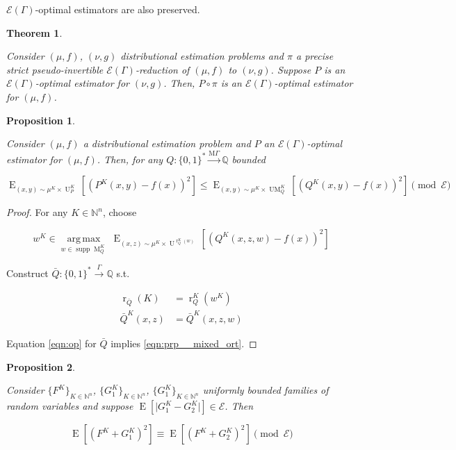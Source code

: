 \documentclass{article}
\numberwithin{equation}{section}
\theoremstyle{definition}
\theoremstyle{plain}
\newtheorem{theorem}{Theorem}[section]
\newtheorem{proposition}{Proposition}[section]
\newcommand{\Bool}{\{0,1\}}
\newcommand{\Words}{{\Bool^*}}
\DeclareMathOperator{\Supp}{supp}
\DeclareMathOperator{\E}{E}
\DeclareMathOperator{\R}{r}
\DeclareMathOperator{\M}{M}
\DeclareMathOperator{\UM}{UM}
\DeclareMathOperator{\Un}{U}
\newcommand{\Argmax}[1]{\underset{#1}{\operatorname{arg\,max}}\,}
\newcommand{\Nats}{\mathbb{N}}
\newcommand{\Rats}{\mathbb{Q}}
\newcommand{\Abs}[1]{\lvert #1 \rvert}
\newcommand{\MGrow}{\mathrm{M}\Gamma}
\newcommand{\Fall}{\mathcal{E}}
\newcommand{\EG}{\Fall(\Gamma)}
\newcommand{\Scheme}{\xrightarrow{\Gamma}}
\newcommand{\MScheme}{\xrightarrow{\MGrow}}
\begin{document}
$\EG$-optimal estimators are also preserved.

\begin{samepage}
\begin{theorem}
\label{thm:psp_reduce}

Consider $(\mu,f)$, $(\nu,g)$ distributional estimation problems and $\pi$ a precise strict pseudo-invertible $\EG$-reduction of $(\mu, f)$ to $(\nu, g)$. Suppose $P$ is an $\EG$-optimal estimator for $(\nu, g)$. Then, $P \circ \pi$ is an $\EG$-optimal estimator for $(\mu, f)$.

\end{theorem}
\end{samepage}

\begin{samepage}
\begin{proposition}
\label{prp:mixed_opt}

Consider ${(\mu,f)}$ a distributional estimation problem and ${P}$ an ${\EG}$-optimal estimator for ${(\mu,f)}$. Then, for any $Q: \Words \MScheme \Rats$ bounded

\begin{equation}
\label{eqn:prp__mixed_ort}
\E_{(x,y) \sim \mu^{K} \times \Un_P^K}[(P^K(x,y) - f(x))^2] \leq \E_{(x,y) \sim \mu^{K} \times \UM_Q^K}[(Q^K(x,y)-f(x))^2] \pmod \Fall
\end{equation}

\end{proposition}
\end{samepage}

\begin{proof}

For any ${K \in \Nats^n}$, choose 

\[w^K \in \Argmax{w \in \Supp \M_Q^K} \E_{(x,z) \sim \mu^{K} \times \Un^{\R_Q^K(w)}}[(Q^K(x,z,w)-f(x))^2]\]

Construct ${\bar{Q}: \Words \Scheme \Rats}$ s.t.

\begin{align*}
\R_{\bar{Q}}(K) &= \R_Q^K(w^K) \\
\bar{Q}^K(x,z) &= \bar{Q}^K(x,z,w)
\end{align*}

Equation \ref{eqn:op} for ${\bar{Q}}$ implies \ref{eqn:prp__mixed_ort}.
%
\end{proof}

\begin{samepage}
\begin{proposition}
\label{prp:sq_diff_cong}

Consider $\{F^K\}_{K \in \Nats^n}$, $\{G_1^K\}_{K \in \Nats^n}$, $\{G_1^K\}_{K \in \Nats^n}$ uniformly bounded families of random variables and suppose ${\E[\Abs{G_1^K - G_2^K}] \in \Fall}$. Then

\begin{equation}
\E[(F^K + G_1^K)^2] \equiv \E[(F^K + G_2^K)^2] \pmod \Fall
\end{equation}

\end{proposition}
\end{samepage}
\end{document}
